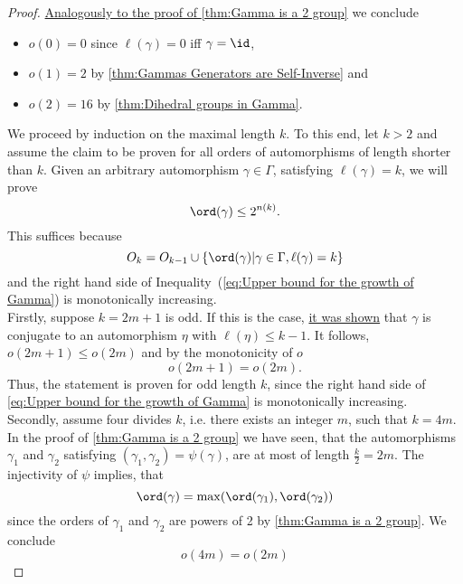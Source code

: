 \begin{proof}
\hyperlink{thm:Base Case}{Analogously to the proof of \cref*{thm:Gamma is a 2 group}} we conclude
\begin{itemize}
\item $o(0)=0$ since $\ell(\gamma)=0$ iff $\gamma=\id$,
\item $o(1)=2$ by \cref{thm:Gammas Generators are Self-Inverse} and
\item $o(2)=16$ by \cref{thm:Dihedral groups in Gamma}.
\end{itemize}
We proceed by induction on the maximal length $k$. To this end, let $k>2$ and assume the claim to be proven for all orders of automorphisms of length shorter than $k$. Given an arbitrary automorphism $\gamma\in\Gamma$, satisfying $\ell(\gamma)=k$, we will prove
\begin{equation*}
\ord(\gamma)\leq 2^{n(k)}.
\end{equation*}
This suffices because
\begin{equation*}
O_k=O_{k-1}\cup \lbrace\ord(\gamma)\vert \gamma\in\Gamma,\ell(\gamma)=k\rbrace
\end{equation*} 
and the right hand side of Inequality~(\ref{eq:Upper bound for the growth of Gamma}) is monotonically increasing.\\
Firstly, suppose $k=2m+1$ is odd. If this is the case, \hyperlink{thm:k is odd}{it was shown} that $\gamma$ is conjugate to an automorphism $\eta$ with $\ell(\eta)\leq k-1$. It follows, $o(2m+1)\leq o(2m)$ and by the monotonicity of $o$
\begin{equation}\label{eq:o(2m+1)=o(2m)}
o(2m+1)=o(2m).
\end{equation}
Thus, the statement is proven for odd length $k$, since the right hand side of \cref{eq:Upper bound for the growth of Gamma} is monotonically increasing.\\
Secondly, assume four divides $k$, i.e. there exists an integer $m$, such that $k=4m$. In the proof of \cref{thm:Gamma is a 2 group} we have seen, that the automorphisms $\gamma_1$ and $\gamma_2$ satisfying $(\gamma_1,\gamma_2)=\psi(\gamma)$, are at most of length $\frac{k}{2}=2m$. The injectivity of $\psi$ implies, that
\begin{equation*}
\ord(\gamma)=\max(\ord(\gamma_1),\ord(\gamma_2))
\end{equation*}
since the orders of $\gamma_1$ and $\gamma_2$ are powers of 2 by \cref{thm:Gamma is a 2 group}. We conclude
\begin{equation}
o(4m)=o(2m)\label{eq:o(4m)=o(2m)}

\end{equation}
\end{proof}
